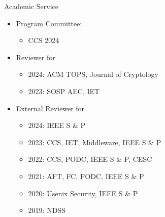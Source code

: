 \documentclass{resume}
\begin{document}
\begin{rSection}{Academic Service}
\label{sec:org34c1689}
\begin{itemize}
\item Program Committee:
\begin{itemize}
\item CCS 2024
\end{itemize}
\end{itemize}
\begin{itemize}
\item Reviewer for
\begin{itemize}
\item 2024: ACM TOPS, Journal of Cryptology
\item 2023: SOSP AEC, IET
\end{itemize}
\item External Reviewer for
\begin{itemize}
\item 2024: IEEE S \& P
\item 2023: CCS, IET, Middleware, IEEE S \& P
\item 2022: CCS, PODC, IEEE S \& P, CESC
\item 2021: AFT, FC, PODC, IEEE S \& P
\item 2020: Usenix Security, IEEE S \& P
\item 2019: NDSS
\end{itemize}
\end{itemize}
\end{rSection}
\end{document}
